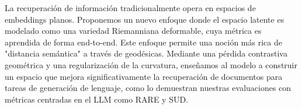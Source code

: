La recuperación de información tradicionalmente opera en espacios de embeddings planos. Proponemos un nuevo enfoque donde el espacio latente es modelado como una variedad Riemanniana deformable, cuya métrica es aprendida de forma end-to-end. Este enfoque permite una noción más rica de "distancia semántica" a través de geodésicas. Mediante una pérdida contrastiva geométrica y una regularización de la curvatura, enseñamos al modelo a construir un espacio que mejora significativamente la recuperación de documentos para tareas de generación de lenguaje, como lo demuestran nuestras evaluaciones con métricas centradas en el LLM como RARE y SUD.
